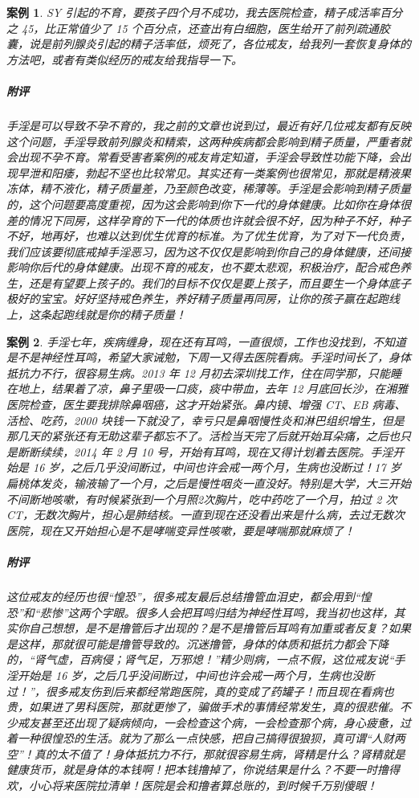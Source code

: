 \documentclass{ctexart}
\newtheorem{case}{案例}
\begin{document}
\begin{case}
    SY 引起的不育，要孩子四个月不成功，我去医院检查，精子成活率百分之 45，比正常值少了 15 个百分点，还查出有白细胞，医生给开了前列疏通胶囊，说是前列腺炎引起的精子活率低，烦死了，各位戒友，给我列一套恢复身体的方法吧，或者有类似经历的戒友给我指导一下。
    \subparagraph{附评} 手淫是可以导致不孕不育的，我之前的文章也说到过，最近有好几位戒友都有反映这个问题，手淫导致前列腺炎和精索，这两种疾病都会影响到精子质量，严重者就会出现不孕不育。常看受害者案例的戒友肯定知道，手淫会导致性功能下降，会出现早泄和阳痿，勃起不坚也比较常见。其实还有一类案例也很常见，那就是精液果冻体，精不液化，精子质量差，乃至颜色改变，稀薄等。手淫是会影响到精子质量的，这个问题要高度重视，因为这会影响到你下一代的身体健康。比如你在身体很差的情况下同房，这样孕育的下一代的体质也许就会很不好，因为种子不好，种子不好，地再好，也难以达到优生优育的标准。为了优生优育，为了对下一代负责，我们应该要彻底戒掉手淫恶习，因为这不仅仅是影响到你自己的身体健康，还间接影响你后代的身体健康。出现不育的戒友，也不要太悲观，积极治疗，配合戒色养生，还是有望要上孩子的。我们的目标不仅仅是要上孩子，而且要生一个身体底子极好的宝宝。好好坚持戒色养生，养好精子质量再同房，让你的孩子赢在起跑线上，这条起跑线就是你的精子质量！
\end{case}

\begin{case}
    手淫七年，疾病缠身，现在还有耳鸣，一直很烦，工作也没找到，不知道是不是神经性耳鸣，希望大家诫勉，下周一又得去医院看病。手淫时间长了，身体抵抗力不行，很容易生病。2013 年 12 月初去深圳找工作，住在同学那，只能睡在地上，结果着了凉，鼻子里吸一口痰，痰中带血，去年 12 月底回长沙，在湘雅医院检查，医生要我排除鼻咽癌，这才开始紧张。鼻内镜、增强 CT、EB 病毒、活检、吃药，2000 块钱一下就没了，幸亏只是鼻咽慢性炎和淋巴组织增生，但是那几天的紧张还有无助这辈子都忘不了。活检当天完了后就开始耳朵痛，之后也只是断断续续，2014 年 2 月 10 号，开始有耳鸣，现在又得计划着去医院。手淫开始是 16 岁，之后几乎没间断过，中间也许会戒一两个月，生病也没断过！17 岁扁桃体发炎，输液输了一个月，之后是慢性咽炎一直没好。特别是大学，大三开始不间断地咳嗽，有时候紧张到一个月照2次胸片，吃中药吃了一个月，拍过 2 次 CT，无数次胸片，担心是肺结核。一直到现在还没看出来是什么病，去过无数次医院，现在又开始担心是不是哮喘变异性咳嗽，要是哮喘那就麻烦了！
    \subparagraph{附评} 这位戒友的经历也很“惶恐”，很多戒友最后总结撸管血泪史，都会用到“惶恐”和“悲惨”这两个字眼。很多人会把耳鸣归结为神经性耳鸣，我当初也这样，其实你自己想想，是不是撸管后才出现的？是不是撸管后耳鸣有加重或者反复？如果是这样，那就很可能是撸管导致的。沉迷撸管，身体的体质和抵抗力都会下降的，“肾气虚，百病侵；肾气足，万邪熄！”精少则病，一点不假，这位戒友说“手淫开始是 16 岁，之后几乎没间断过，中间也许会戒一两个月，生病也没断过！”，很多戒友伤到后来都经常跑医院，真的变成了药罐子！而且现在看病也贵，如果进了男科医院，那就更惨了，骗做手术的事情经常发生，真的很悲催。不少戒友甚至还出现了疑病倾向，一会检查这个病，一会检查那个病，身心疲惫，过着一种很惶恐的生活。就为了那么一点快感，把自己搞得很狼狈，真可谓“人财两空”！真的太不值了！身体抵抗力不行，那就很容易生病，肾精是什么？肾精就是健康货币，就是身体的本钱啊！把本钱撸掉了，你说结果是什么？不要一时撸得欢，小心将来医院拉清单！医院是会和撸者算总账的，到时候千万别傻眼！
\end{case}
\end{document}
